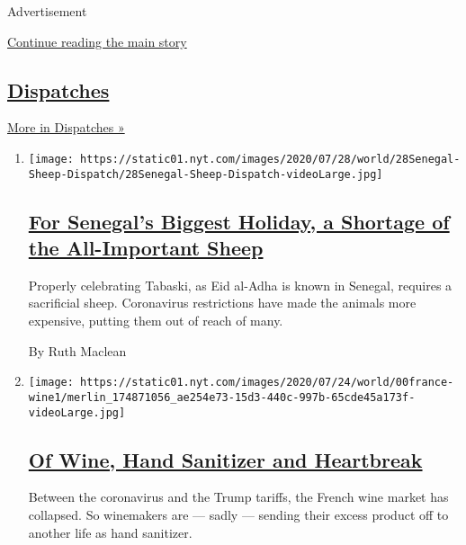 Advertisement

\protect\hyperlink{after-mid2}{Continue reading the main story}

\hypertarget{dispatches}{%
\subsection{\texorpdfstring{\href{/spotlight/dispatches-international}{Dispatches}}{Dispatches}}\label{dispatches}}

\href{/spotlight/dispatches-international}{More in Dispatches »}

\begin{enumerate}
\def\labelenumi{\arabic{enumi}.}
\item
  \texttt{[image: https://static01.nyt.com/images/2020/07/28/world/28Senegal-Sheep-Dispatch/28Senegal-Sheep-Dispatch-videoLarge.jpg]}

  \hypertarget{for-senegals-biggest-holiday-a-shortage-of-the-all-important-sheep}{%
  \subsection{\texorpdfstring{\href{/2020/07/29/world/africa/senegal-tabaski-sheep-eid-adha.html}{For
  Senegal's Biggest Holiday, a Shortage of the All-Important
  Sheep}}{For Senegal's Biggest Holiday, a Shortage of the All-Important Sheep}}\label{for-senegals-biggest-holiday-a-shortage-of-the-all-important-sheep}}

  Properly celebrating Tabaski, as Eid al-Adha is known in Senegal,
  requires a sacrificial sheep. Coronavirus restrictions have made the
  animals more expensive, putting them out of reach of many.

  By Ruth Maclean
\item
  \texttt{[image: https://static01.nyt.com/images/2020/07/24/world/00france-wine1/merlin\_174871056\_ae254e73-15d3-440c-997b-65cde45a173f-videoLarge.jpg]}

  \hypertarget{of-wine-hand-sanitizer-and-heartbreak}{%
  \subsection{\texorpdfstring{\href{/2020/07/27/world/europe/france-alsace-wine-coronavirus.html}{Of
  Wine, Hand Sanitizer and
  Heartbreak}}{Of Wine, Hand Sanitizer and Heartbreak}}\label{of-wine-hand-sanitizer-and-heartbreak}}

  Between the coronavirus and the Trump tariffs, the French wine market
  has collapsed. So winemakers are --- sadly --- sending their excess
  product off to another life as hand sanitizer.


\end{enumerate}
